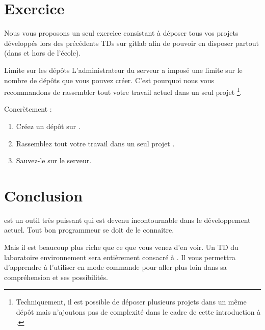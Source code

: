 \documentclass[a4paper,11pt]{style-esi/td}
\begin{document}
\section{Exercice}

Nous vous proposons un seul exercice
consistant à déposer tous vos projets  développés
lors des précédents TDs sur gitlab afin de pouvoir en disposer partout
(dans et hors de l'école).

\begin{infoit}{Limite sur les dépôts}
	L'administrateur du serveur 
	a imposé une limite sur le nombre de dépôts que
	vous pouvez créer.
	C'est pourquoi nous vous recommandons de rassembler tout votre travail 
	actuel dans un seul projet %
	\footnote{%
		Techniquement, 
		il est possible de déposer plusieurs projets 
		dans un même dépôt mais n'ajoutons pas de complexité
		dans le cadre de cette introduction à .
	}.
\end{infoit}

Concrètement :
\begin{enumerate}
\item Créez un dépôt sur .
\item Rassemblez tout votre travail dans un seul projet .
\item Sauvez-le sur le serveur.
\end{enumerate}

\section{Conclusion}

 est un outil très puissant qui est devenu incontournable
dans le développement actuel.
Tout bon programmeur se doit de le connaitre.

Mais il est beaucoup plus riche que ce que vous venez d'en voir.
Un TD du laboratoire environnement sera entièrement consacré à .
Il vous permettra d'apprendre à l'utiliser en mode commande
pour aller plus loin dans sa compréhension et ses possibilités.
\end{document}
